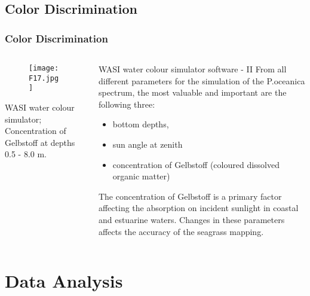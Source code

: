 \documentclass[pdflatex,compress]{beamer}
\begin{document}
\subsection{Color Discrimination}
\begin{frame}\frametitle{Color Discrimination}
\begin{minipage}[0.4\textheight]{\textwidth}
\begin{columns}[T]
\begin{column}{0.5\textwidth}
\begin{figure}[H]
	\centering
		\texttt{[image: F17.jpg]}
\end{figure}
\scriptsize{WASI water colour simulator; Concentration of Gelbstoff at depths 0.5 - 8.0 m.}
\end{column}
\begin{column}{0.5\textwidth}
\footnotesize{WASI water colour simulator software - II
From all different parameters for the simulation of the P.oceanica spectrum, the
most valuable and important are the following three:
\begin{itemize}
	\item bottom depths,
	\item sun angle at zenith
	\item concentration of Gelbstoff (coloured dissolved organic matter)
\end{itemize}
The concentration of Gelbstoff is a primary factor affecting the absorption on incident sunlight in coastal and estuarine waters. Changes in these parameters affects the accuracy of the seagrass mapping. }
\end{column}
\end{columns}
\end{minipage}
\end{frame}

\section{Data Analysis}
\end{document}
